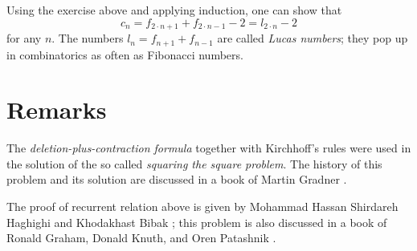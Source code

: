 Using the exercise above and applying induction, one can show that 
\[c_n=f_{2\cdot n+1}+f_{2\cdot n-1}-2=l_{2\cdot  n}-2\]
for any $n$.
The numbers $l_n=f_{n+1}+f_{n-1}$ are called \emph{Lucas numbers};
they pop up in combinatorics as often as Fibonacci numbers.  

\section*{Remarks}

The \emph{deletion-plus-contraction formula} together with Kirchhoff's rules were used in the solution of the so called \emph{squaring the square problem}.
The history of this problem and its solution are discussed in a book of Martin Gradner \cite[Chapter 17]{gardiner}.

The proof of recurrent relation above is given by Mohammad Hassan Shirdareh Haghighi and Khodakhast Bibak \cite[see][]{haghighi-bibak};
this problem is also discussed in a book of  Ronald Graham, Donald Knuth, and Oren Patashnik \cite[see][]{knut}.
